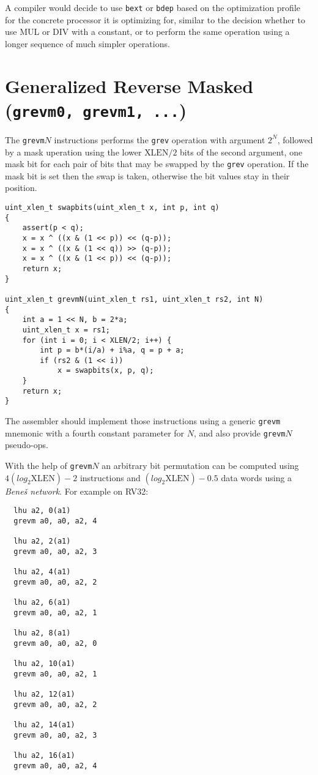 A compiler would decide to use \texttt{bext} or \texttt{bdep} based on the optimization
profile for the concrete processor it is optimizing for, similar to the decision whether
to use MUL or DIV with a constant, or to perform the same operation using a
longer sequence of much simpler operations.


\section{Generalized Reverse Masked (\texttt{grevm0, grevm1, ...})}

The \texttt{grevm}$N$ instructions performs the \texttt{grev} operation
with argument $2^N$, followed by a mask uperation using the lower
$\textrm{XLEN}/2$ bits of the second argument, one mask bit for each pair of bits
that may be swapped by the \texttt{grev} operation. If the mask bit
is set then the swap is taken, otherwise the bit values stay in their
position.

\begin{verbatim}
uint_xlen_t swapbits(uint_xlen_t x, int p, int q)
{
    assert(p < q);
    x = x ^ ((x & (1 << p)) << (q-p));
    x = x ^ ((x & (1 << q)) >> (q-p));
    x = x ^ ((x & (1 << p)) << (q-p));
    return x;
}

uint_xlen_t grevmN(uint_xlen_t rs1, uint_xlen_t rs2, int N)
{
    int a = 1 << N, b = 2*a;
    uint_xlen_t x = rs1;
    for (int i = 0; i < XLEN/2; i++) {
        int p = b*(i/a) + i%a, q = p + a;
        if (rs2 & (1 << i))
            x = swapbits(x, p, q);
    }
    return x;
}
\end{verbatim}

The assembler should implement those instructions using a generic \texttt{grevm}
mnemonic with a fourth constant parameter for $N$, and also provide
\texttt{grevm}$N$ pseudo-ops.

With the help of \texttt{grevm}$N$ an arbitrary bit permutation can be computed
using $4(log_2\textrm{XLEN})-2$ instructions and $(log_2\textrm{XLEN})-0.5$ data words using a
{\it Bene\v{s} network}. For example on RV32:

\begin{verbatim}
  lhu a2, 0(a1)
  grevm a0, a0, a2, 4

  lhu a2, 2(a1)
  grevm a0, a0, a2, 3

  lhu a2, 4(a1)
  grevm a0, a0, a2, 2

  lhu a2, 6(a1)
  grevm a0, a0, a2, 1

  lhu a2, 8(a1)
  grevm a0, a0, a2, 0

  lhu a2, 10(a1)
  grevm a0, a0, a2, 1

  lhu a2, 12(a1)
  grevm a0, a0, a2, 2

  lhu a2, 14(a1)
  grevm a0, a0, a2, 3

  lhu a2, 16(a1)
  grevm a0, a0, a2, 4
\end{verbatim}

